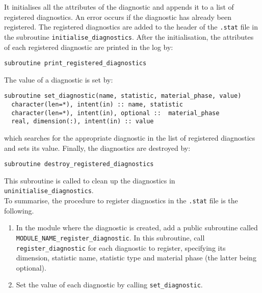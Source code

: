 \documentclass[a4paper, 11pt]{book}
\begin{document}
It initialises all the attributes of the diagnostic and appends it to a list of registered diagnostics. An error occurs if the diagnostic has already been registered. The registered diagnostics are added to the header of the \lstinline+.stat+ file in the subroutine \lstinline+initialise_diagnostics+. After the initialisation, the attributes of each registered diagnostic are printed in the log by:

\begin{lstlisting}
subroutine print_registered_diagnostics
\end{lstlisting}

The value of a diagnostic is set by:

\begin{lstlisting}
subroutine set_diagnostic(name, statistic, material_phase, value)
  character(len=*), intent(in) :: name, statistic 
  character(len=*), intent(in), optional ::  material_phase
  real, dimension(:), intent(in) :: value
\end{lstlisting}

which searches for the appropriate diagnostic in the list of registered diagnostics and sets its value.
Finally, the diagnostics are destroyed by:

\begin{lstlisting}
subroutine destroy_registered_diagnostics
\end{lstlisting}

This subroutine is called to clean up the diagnostics in \lstinline+uninitialise_diagnostics+.\\

To summarise, the procedure to register diagnostics in the \lstinline+.stat+ file is the following.

\begin{enumerate}
\item In the module where the diagnostic is created, add a public subroutine called\\ \lstinline+MODULE_NAME_register_diagnostic+. In this subroutine, call \lstinline+register_diagnostic+ for each diagnostic to register, specifying its dimension, statistic name, statistic type and material phase (the latter being optional).
\item Set the value of each diagnostic by calling \lstinline+set_diagnostic+.
\end{enumerate}
\end{document}
